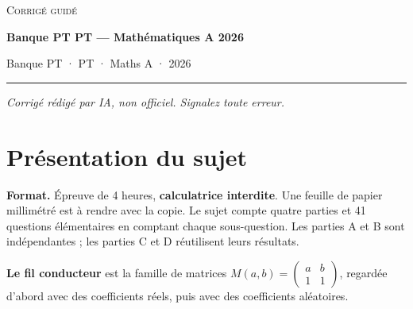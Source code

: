 \documentclass[11pt,a4paper]{article}
\begin{document}
\thispagestyle{plain}
\begin{center}
  {\small\scshape Corrigé guidé}\par\smallskip
  {\LARGE\bfseries Banque PT PT — Mathématiques A 2026\par}\medskip
  {\large Banque PT · PT · Maths A · 2026\par}
\end{center}
\vspace{2pt}\hrule\vspace{8pt}

\emph{Corrigé rédigé par IA, non officiel. Signalez toute erreur.}

\hypertarget{pruxe9sentation-du-sujet}{%
\section{Présentation du sujet}\label{pruxe9sentation-du-sujet}}

\textbf{Format.} Épreuve de 4 heures, \textbf{calculatrice interdite}. Une feuille de papier millimétré est à rendre avec la copie. Le sujet compte quatre parties et 41 questions élémentaires en comptant chaque sous-question. Les parties A et B sont indépendantes ; les parties C et D réutilisent leurs résultats.

\textbf{Le fil conducteur} est la famille de matrices \(M(a,b)=\begin{pmatrix}a&b\\1&1\end{pmatrix}\), regardée d'abord avec des coefficients réels, puis avec des coefficients aléatoires.
\end{document}

